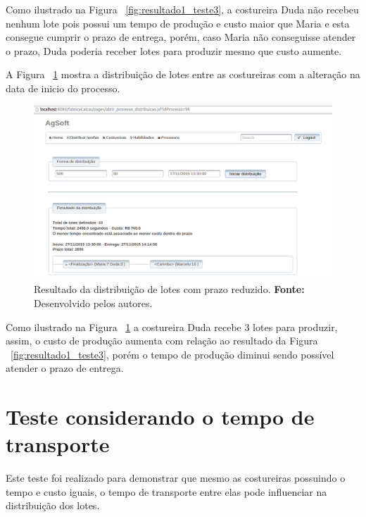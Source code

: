 \par Como ilustrado na Figura ~\ref{fig:resultado1_teste3}, a costureira Duda
não recebeu nenhum lote pois possui um tempo de produção e custo maior que Maria e
esta consegue cumprir o prazo de entrega, porém, caso Maria não conseguisse atender
o prazo, Duda poderia receber lotes para produzir mesmo que custo aumente.

A Figura ~\ref{fig:resultado2_teste3} mostra a distribuição de lotes entre as
costureiras com a alteração na data de inicio do processo.

\newpage

\begin{figure}[h!]
	\centerline{\includegraphics[scale=0.3]{./imagens/resultado2_teste3.png}}
	\caption[Resultado da distribuição de lotes com prazo reduzido.]
	{Resultado da distribuição de lotes com prazo reduzido. \textbf{Fonte:} Desenvolvido pelos
	autores.}
	\label{fig:resultado2_teste3}
\end{figure}

\par Como ilustrado na Figura ~\ref{fig:resultado2_teste3} a costureira Duda
recebe 3 lotes para produzir, assim, o custo de produção aumenta com relação ao 
resultado da Figura ~\ref{fig:resultado1_teste3}, porém o tempo de produção diminui
sendo possível atender o prazo de entrega.


\section{Teste considerando o tempo de transporte}

\par Este teste foi realizado para demonstrar que mesmo as costureiras possuindo
o tempo e custo iguais, o tempo de transporte entre elas pode influenciar na distribuição dos lotes.

